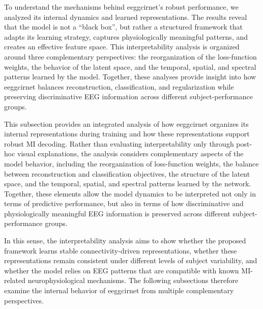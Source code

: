 To understand the mechanisms behind \gls{eeggcirnet}'s robust performance, we analyzed its internal dynamics and learned representations. The results reveal that the model is not a ``black box'', but rather a structured framework that adapts its learning strategy, captures physiologically meaningful patterns, and creates an effective feature space. {This interpretability analysis is organized around three complementary perspectives: the reorganization of the loss-function weights, the behavior of the latent space, and the temporal, spatial, and spectral patterns learned by the model. Together, these analyses provide insight into how \gls{eeggcirnet} balances reconstruction, classification, and regularization while preserving discriminative EEG information across different subject-performance groups.}

{This subsection provides an integrated analysis of how \gls{eeggcirnet} organizes its internal representations during training and how these representations support robust MI decoding. Rather than evaluating interpretability only through post-hoc visual explanations, the analysis considers complementary aspects of the model behavior, including the reorganization of loss-function weights, the balance between reconstruction and classification objectives, the structure of the latent space, and the temporal, spatial, and spectral patterns learned by the network. Together, these elements allow the model dynamics to be interpreted not only in terms of predictive performance, but also in terms of how discriminative and physiologically meaningful EEG information is preserved across different subject-performance groups.}

{In this sense, the interpretability analysis aims to show whether the proposed framework learns stable connectivity-driven representations, whether these representations remain consistent under different levels of subject variability, and whether the model relies on EEG patterns that are compatible with known MI-related neurophysiological mechanisms. The following subsections therefore examine the internal behavior of \gls{eeggcirnet} from multiple complementary perspectives.}

